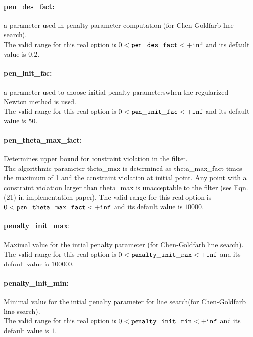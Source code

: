 \paragraph{pen\_des\_fact:}\label{opt:pen_des_fact} a parameter used in penalty parameter computation (for Chen-Goldfarb line search). \\
 The valid range for this real option is 
$0 <  {\tt pen\_des\_fact } <  {\tt +inf}$
and its default value is $0.2$.


\paragraph{pen\_init\_fac:}\label{opt:pen_init_fac} a parameter used to choose initial penalty parameterswhen the regularized Newton method is used. \\
 The valid range for this real option is 
$0 <  {\tt pen\_init\_fac } <  {\tt +inf}$
and its default value is $50$.


\paragraph{pen\_theta\_max\_fact:}\label{opt:pen_theta_max_fact} Determines upper bound for constraint violation in the filter. \\
 The algorithmic parameter theta\_max is determined as theta\_max\_fact times the maximum of 1 and the constraint violation at initial point.  Any point with a constraint violation larger than theta\_max is unacceptable to the filter (see Eqn. (21) in implementation paper). The valid range for this real option is 
$0 <  {\tt pen\_theta\_max\_fact } <  {\tt +inf}$
and its default value is $10000$.


\paragraph{penalty\_init\_max:}\label{opt:penalty_init_max} Maximal value for the intial penalty parameter (for Chen-Goldfarb line search). \\
 The valid range for this real option is 
$0 <  {\tt penalty\_init\_max } <  {\tt +inf}$
and its default value is $100000$.


\paragraph{penalty\_init\_min:}\label{opt:penalty_init_min} Minimal value for the intial penalty parameter for line search(for Chen-Goldfarb line search). \\
 The valid range for this real option is 
$0 <  {\tt penalty\_init\_min } <  {\tt +inf}$
and its default value is $1$.


